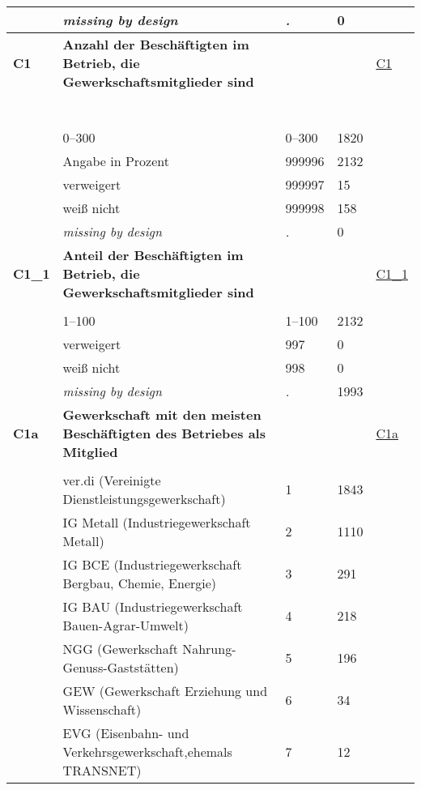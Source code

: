 \begin{longtable}{| L{2.65cm} | L{8cm} | C{1.5cm} | R{1.25cm} | C{2.25cm}  |}
   & \textit{missing by design} & \textit{.} & 0 &  \\ 
   \midrule
\textbf{C1}\label{var:C1} & \textbf{Anzahl der Beschäftigten im Betrieb, die Gewerkschaftsmitglieder sind} &  &  & \hyperref[C1]{C1} \\ 
   & \protect\subsection[Variablen C1 bis Order03\_D1c]{} &  &  &  \\ 
   & 0--300 & 0--300 & 1820 &  \\ 
   & Angabe in Prozent & 999996 & 2132 &  \\ 
   & verweigert & 999997 & 15 &  \\ 
   & weiß nicht & 999998 & 158 &  \\ 
   & \textit{missing by design} & \textit{.} & 0 &  \\ 
   \midrule
\textbf{C1\_1}\label{var:C1:1} & \textbf{Anteil der Beschäftigten im Betrieb, die Gewerkschaftsmitglieder sind} &  &  & \hyperref[C1:1]{C1\_1} \\ 
   &  &  &  &  \\ 
   & 1--100 & 1--100 & 2132 &  \\ 
   & verweigert & 997 & 0 &  \\ 
   & weiß nicht & 998 & 0 &  \\ 
   & \textit{missing by design} & \textit{.} & 1993 &  \\ 
   \midrule
\textbf{C1a}\label{var:C1a} & \textbf{Gewerkschaft mit den meisten Beschäftigten des Betriebes als Mitglied} &  &  & \hyperref[C1a]{C1a} \\ 
   &  &  &  &  \\ 
   & ver.di (Vereinigte Dienstleistungsgewerkschaft) & 1 & 1843 &  \\ 
   & IG Metall (Industriegewerkschaft Metall) & 2 & 1110 &  \\ 
   & IG BCE (Industriegewerkschaft Bergbau, Chemie, Energie) & 3 & 291 &  \\ 
   & IG BAU (Industriegewerkschaft Bauen-Agrar-Umwelt) & 4 & 218 &  \\ 
   & NGG (Gewerkschaft Nahrung-Genuss-Gaststätten) & 5 & 196 &  \\ 
   & GEW (Gewerkschaft Erziehung und Wissenschaft) & 6 & 34 &  \\ 
   & EVG (Eisenbahn- und Verkehrsgewerkschaft,ehemals TRANSNET) & 7 & 12 &  \\ 

\end{longtable}
